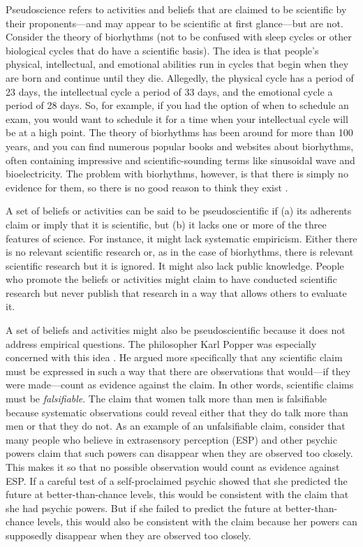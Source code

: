 Pseudoscience refers to activities and beliefs that are claimed to be scientific by their proponents---and may appear to be scientific at first glance---but are not. Consider the theory of biorhythms (not to be confused with sleep cycles or other biological cycles that do have a scientific basis). The idea is that people's physical, intellectual, and emotional abilities run in cycles that begin when they are born and continue until they die. Allegedly, the physical cycle has a period of 23 days, the intellectual cycle a period of 33 days, and the emotional cycle a period of 28 days. So, for example, if you had the option of when to schedule an exam, you would want to schedule it for a time when your intellectual cycle will be at a high point. The theory of biorhythms has been around for more than 100 years, and you can find numerous popular books and websites about biorhythms, often containing impressive and scientific-sounding terms like sinusoidal wave and bioelectricity. The problem with biorhythms, however, is that there is simply no evidence for them, so there is no good reason to think they exist \citep{hines_comprehensive_1998}.

A set of beliefs or activities can be said to be pseudoscientific if (a) its adherents claim or imply that it is scientific, but (b) it lacks one or more of the three features of science. For instance, it might lack systematic empiricism. Either there is no relevant scientific research or, as in the case of biorhythms, there is relevant scientific research but it is ignored. It might also lack public knowledge. People who promote the beliefs or activities might claim to have conducted scientific research but never publish that research in a way that allows others to evaluate it.

A set of beliefs and activities might also be pseudoscientific because it does not address empirical questions. The philosopher Karl Popper was especially concerned with this idea \citep{popper_conjectures_2014}. He argued more specifically that any scientific claim must be expressed in such a way that there are observations that would---if they were made---count as evidence against the claim. In other words, scientific claims must be \emph{falsifiable}. The claim that women talk more than men is falsifiable because systematic observations could reveal either that they do talk more than men or that they do not. As an example of an unfalsifiable claim, consider that many people who believe in extrasensory perception (ESP) and other psychic powers claim that such powers can disappear when they are observed too closely. This makes it so that no possible observation would count as evidence against ESP. If a careful test of a self-proclaimed psychic showed that she predicted the future at better-than-chance levels, this would be consistent with the claim that she had psychic powers. But if she failed to predict the future at better-than-chance levels, this would also be consistent with the claim because her powers can supposedly disappear when they are observed too closely.

